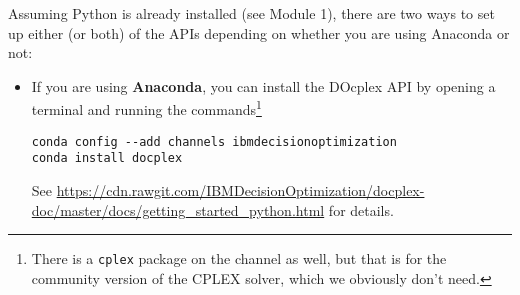 \documentclass[12pt]{article}
\begin{document}
Assuming Python is already installed (see Module 1), there are two ways to set up either (or both) of the APIs depending on whether you are using Anaconda or not:
\begin{itemize}
    \item If you are using \textbf{Anaconda}, you can install the DOcplex API by opening a terminal and running the commands\footnote{
        There is a \texttt{cplex} package on the channel as well, but that is for the community version of the CPLEX solver, which we obviously don't need.
        }
\begin{verbatim}
conda config --add channels ibmdecisionoptimization
conda install docplex
\end{verbatim}
        See \url{https://cdn.rawgit.com/IBMDecisionOptimization/docplex-doc/master/docs/getting_started_python.html} for details.


\end{itemize}
\end{document}
